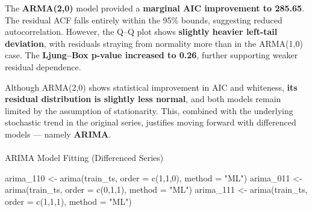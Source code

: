 \documentclass[
  11pt,
]{article}
\makeatletter
\let\oldparagraph\paragraph
\renewcommand{\paragraph}{
    \@ifstar
      \xxxParagraphStar
      \xxxParagraphNoStar
  }
\newcommand{\xxxParagraphStar}[1]{\oldparagraph*{#1}\mbox{}}
\newcommand{\xxxParagraphNoStar}[1]{\oldparagraph{#1}\mbox{}}
\newenvironment{Shaded}{\begin{snugshade}}{\end{snugshade}}
\newcommand{\AttributeTok}[1]{\textcolor[rgb]{0.40,0.45,0.13}{#1}}
\newcommand{\DecValTok}[1]{\textcolor[rgb]{0.68,0.00,0.00}{#1}}
\newcommand{\FunctionTok}[1]{\textcolor[rgb]{0.28,0.35,0.67}{#1}}
\newcommand{\NormalTok}[1]{\textcolor[rgb]{0.00,0.23,0.31}{#1}}
\newcommand{\OtherTok}[1]{\textcolor[rgb]{0.00,0.23,0.31}{#1}}
\newcommand{\StringTok}[1]{\textcolor[rgb]{0.13,0.47,0.30}{#1}}
\makeatother
\begin{document}
The \textbf{ARMA(2,0)} model provided a \textbf{marginal AIC improvement
to 285.65}. The residual ACF falls entirely within the 95\% bounds,
suggesting reduced autocorrelation. However, the Q--Q plot shows
\textbf{slightly heavier left-tail deviation}, with residuals straying
from normality more than in the ARMA(1,0) case. The \textbf{Ljung--Box
p-value increased to 0.26}, further supporting weaker residual
dependence.

Although ARMA(2,0) shows statistical improvement in AIC and whiteness,
\textbf{its residual distribution is slightly less normal}, and both
models remain limited by the assumption of stationarity. This, combined
with the underlying stochastic trend in the original series, justifies
moving forward with differenced models --- namely \textbf{ARIMA}.

\paragraph{ARIMA Model Fitting (Differenced
Series)}\label{arima-model-fitting-differenced-series}

\begin{Shaded}
\begin{Highlighting}[]
\NormalTok{arima\_110 }\OtherTok{\textless{}{-}} \FunctionTok{arima}\NormalTok{(train\_ts, }\AttributeTok{order =} \FunctionTok{c}\NormalTok{(}\DecValTok{1}\NormalTok{,}\DecValTok{1}\NormalTok{,}\DecValTok{0}\NormalTok{), }\AttributeTok{method =} \StringTok{"ML"}\NormalTok{)}
\NormalTok{arima\_011 }\OtherTok{\textless{}{-}} \FunctionTok{arima}\NormalTok{(train\_ts, }\AttributeTok{order =} \FunctionTok{c}\NormalTok{(}\DecValTok{0}\NormalTok{,}\DecValTok{1}\NormalTok{,}\DecValTok{1}\NormalTok{), }\AttributeTok{method =} \StringTok{"ML"}\NormalTok{)}
\NormalTok{arima\_111 }\OtherTok{\textless{}{-}} \FunctionTok{arima}\NormalTok{(train\_ts, }\AttributeTok{order =} \FunctionTok{c}\NormalTok{(}\DecValTok{1}\NormalTok{,}\DecValTok{1}\NormalTok{,}\DecValTok{1}\NormalTok{), }\AttributeTok{method =} \StringTok{"ML"}\NormalTok{)}
\end{Highlighting}
\end{Shaded}
\end{document}
